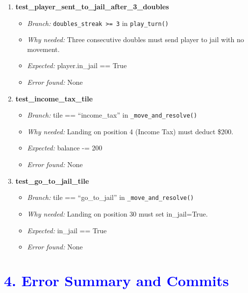 \documentclass{article}
\begin{document}
\begin{enumerate}[resume, label=\textbf{TC\arabic*.}]

  \item \textbf{test\_player\_sent\_to\_jail\_after\_3\_doubles}
  \begin{itemize}[noitemsep]
    \item \textit{Branch:} \texttt{doubles\_streak >= 3} in \texttt{play\_turn()}
    \item \textit{Why needed:} Three consecutive doubles must send player to jail with no movement.
    \item \textit{Expected:} player.in\_jail == True
    \item \textit{Error found:} None
  \end{itemize}

  \item \textbf{test\_income\_tax\_tile}
  \begin{itemize}[noitemsep]
    \item \textit{Branch:} tile == ``income\_tax'' in \texttt{\_move\_and\_resolve()}
    \item \textit{Why needed:} Landing on position 4 (Income Tax) must deduct \$200.
    \item \textit{Expected:} balance -= 200
    \item \textit{Error found:} None
  \end{itemize}

  \item \textbf{test\_go\_to\_jail\_tile}
  \begin{itemize}[noitemsep]
    \item \textit{Branch:} tile == ``go\_to\_jail'' in \texttt{\_move\_and\_resolve()}
    \item \textit{Why needed:} Landing on position 30 must set in\_jail=True.
    \item \textit{Expected:} in\_jail == True
    \item \textit{Error found:} None
  \end{itemize}

\end{enumerate}

\section*{\textcolor{blue}{4. Error Summary and Commits}}
\end{document}
